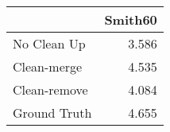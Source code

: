 \begin{tabular}{lr}
\toprule
{} & Smith60 \\
\midrule
No Clean Up  &   3.586 \\
Clean-merge  &   4.535 \\
Clean-remove &   4.084 \\
Ground Truth &   4.655 \\
\bottomrule
\end{tabular}
